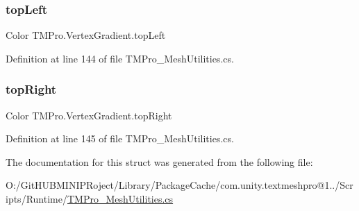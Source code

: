\subsubsection{\texorpdfstring{topLeft}{topLeft}}
{\footnotesize\ttfamily Color T\+M\+Pro.\+Vertex\+Gradient.\+top\+Left}



Definition at line 144 of file T\+M\+Pro\+\_\+\+Mesh\+Utilities.\+cs.

\mbox{\label{struct_t_m_pro_1_1_vertex_gradient_a1c53b6b33507f9351fd5f86ddca13d3a}} 
\subsubsection{\texorpdfstring{topRight}{topRight}}
{\footnotesize\ttfamily Color T\+M\+Pro.\+Vertex\+Gradient.\+top\+Right}



Definition at line 145 of file T\+M\+Pro\+\_\+\+Mesh\+Utilities.\+cs.



The documentation for this struct was generated from the following file\+:\begin{DoxyCompactItemize}
\item 
O\+:/\+Git\+H\+U\+B\+M\+I\+N\+I\+P\+Roject/\+Library/\+Package\+Cache/com.\+unity.\+textmeshpro@1../\+Scripts/\+Runtime/\mbox{\hyperlink{_t_m_pro___mesh_utilities_8cs}{T\+M\+Pro\+\_\+\+Mesh\+Utilities.\+cs}}\end{DoxyCompactItemize}
